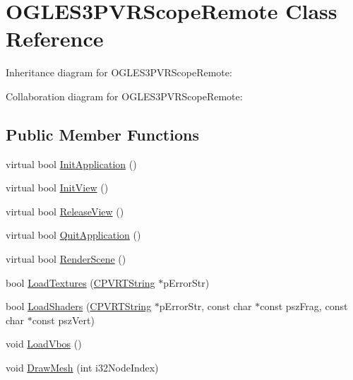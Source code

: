\hypertarget{class_o_g_l_e_s3_p_v_r_scope_remote}{\section{O\+G\+L\+E\+S3\+P\+V\+R\+Scope\+Remote Class Reference}
\label{class_o_g_l_e_s3_p_v_r_scope_remote}
}


Inheritance diagram for O\+G\+L\+E\+S3\+P\+V\+R\+Scope\+Remote\+:


Collaboration diagram for O\+G\+L\+E\+S3\+P\+V\+R\+Scope\+Remote\+:
\subsection*{Public Member Functions}
\begin{DoxyCompactItemize}
\item 
virtual bool \hyperlink{class_o_g_l_e_s3_p_v_r_scope_remote_a37b9e4d004febdb5d87c44e13ea46d27}{Init\+Application} ()
\item 
virtual bool \hyperlink{class_o_g_l_e_s3_p_v_r_scope_remote_acdb46d8149ddf4a6c98838cda2c32787}{Init\+View} ()
\item 
virtual bool \hyperlink{class_o_g_l_e_s3_p_v_r_scope_remote_a1581fb32be10f61f29efad02f65258b7}{Release\+View} ()
\item 
virtual bool \hyperlink{class_o_g_l_e_s3_p_v_r_scope_remote_a2b3ce284a025db54d2ce0261d325e1a4}{Quit\+Application} ()
\item 
virtual bool \hyperlink{class_o_g_l_e_s3_p_v_r_scope_remote_a17fa6e265c545eeeb912f18d7c8c2fe2}{Render\+Scene} ()
\item 
bool \hyperlink{class_o_g_l_e_s3_p_v_r_scope_remote_a3e3ec32e7af34ef970afeac6608413fa}{Load\+Textures} (\hyperlink{class_c_p_v_r_t_string}{C\+P\+V\+R\+T\+String} $\ast$p\+Error\+Str)
\item 
bool \hyperlink{class_o_g_l_e_s3_p_v_r_scope_remote_a7ddf9758a2baf1dccfc7396f9eb6f494}{Load\+Shaders} (\hyperlink{class_c_p_v_r_t_string}{C\+P\+V\+R\+T\+String} $\ast$p\+Error\+Str, const char $\ast$const psz\+Frag, const char $\ast$const psz\+Vert)
\item 
void \hyperlink{class_o_g_l_e_s3_p_v_r_scope_remote_a708baf19decc4a9c9f1ead03cf4c0d54}{Load\+Vbos} ()
\item 
void \hyperlink{class_o_g_l_e_s3_p_v_r_scope_remote_a91f8fabe8b9c60c00233c766184dac3e}{Draw\+Mesh} (int i32\+Node\+Index)
\end{DoxyCompactItemize}



